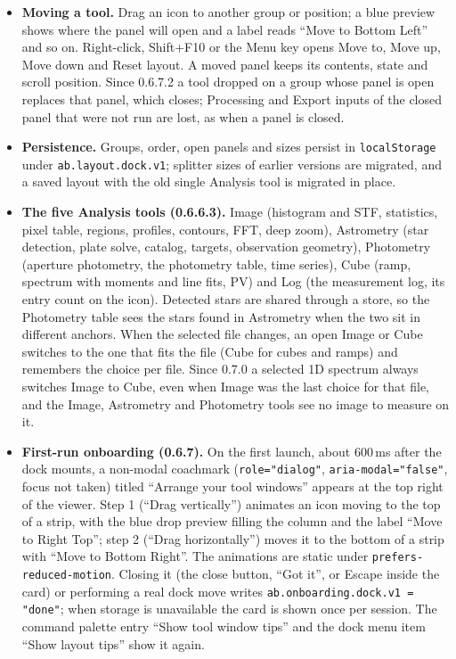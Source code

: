 \documentclass[11pt,a4paper]{article}
\newcommand{\code}[1]{\texttt{\small #1}}
\begin{document}
    \begin{itemize}[nosep]
    \item \textbf{Moving a tool.} Drag an icon to another group or position; a blue preview shows where the panel will open and a label reads ``Move to Bottom Left'' and so on. Right-click, Shift+F10 or the Menu key opens Move to, Move up, Move down and Reset layout. A moved panel keeps its contents, state and scroll position. Since 0.6.7.2 a tool dropped on a group whose panel is open replaces that panel, which closes; Processing and Export inputs of the closed panel that were not run are lost, as when a panel is closed.
    \item \textbf{Persistence.} Groups, order, open panels and sizes persist in \code{localStorage} under \code{ab.layout.dock.v1}; splitter sizes of earlier versions are migrated, and a saved layout with the old single Analysis tool is migrated in place.
    \item \textbf{The five Analysis tools (0.6.6.3).} Image (histogram and STF, statistics, pixel table, regions, profiles, contours, FFT, deep zoom), Astrometry (star detection, plate solve, catalog, targets, observation geometry), Photometry (aperture photometry, the photometry table, time series), Cube (ramp, spectrum with moments and line fits, PV) and Log (the measurement log, its entry count on the icon). Detected stars are shared through a store, so the Photometry table sees the stars found in Astrometry when the two sit in different anchors. When the selected file changes, an open Image or Cube switches to the one that fits the file (Cube for cubes and ramps) and remembers the choice per file. Since 0.7.0 a selected 1D spectrum always switches Image to Cube, even when Image was the last choice for that file, and the Image, Astrometry and Photometry tools see no image to measure on it.
    \item \textbf{First-run onboarding (0.6.7).} On the first launch, about 600\,ms after the dock mounts, a non-modal coachmark (\code{role="dialog"}, \code{aria-modal="false"}, focus not taken) titled ``Arrange your tool windows'' appears at the top right of the viewer. Step 1 (``Drag vertically'') animates an icon moving to the top of a strip, with the blue drop preview filling the column and the label ``Move to Right Top''; step 2 (``Drag horizontally'') moves it to the bottom of a strip with ``Move to Bottom Right''. The animations are static under \code{prefers-reduced-motion}. Closing it (the close button, ``Got it'', or Escape inside the card) or performing a real dock move writes \code{ab.onboarding.dock.v1 = "done"}; when storage is unavailable the card is shown once per session. The command palette entry ``Show tool window tips'' and the dock menu item ``Show layout tips'' show it again.
    \end{itemize}
\end{document}
